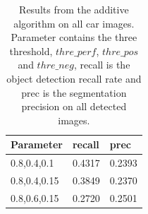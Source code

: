 \documentclass[10pt,twocolumn,letterpaper]{article}
\begin{document}
\begin{table}
\centering
\begin{tabular}{|l|l|l|}
\hline Parameter & recall & prec \\
\hline 0.8,0.4,0.1  & 0.4317 & 0.2393 \\
\hline 0.8,0.4,0.15  & 0.3849 & 0.2370 \\
\hline 0.8,0.6,0.15  & 0.2720 & 0.2501 \\
\hline
\end{tabular}
\caption{Results from the additive algorithm on all car images.
Parameter contains the three threshold, $thre\_perf$, $thre\_pos$
and $thre\_neg$, recall is the object detection recall rate and prec
is the segmentation precision on all detected images.}
\label{table:aresults}
\end{table}
\end{document}

